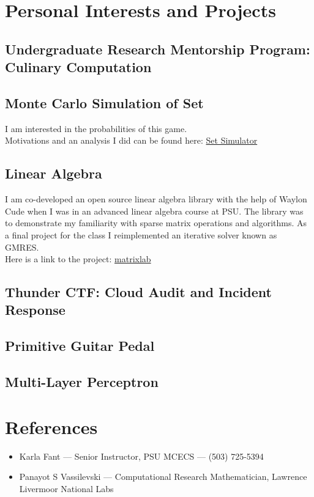 \documentclass{article}
\begin{document}
\section{Personal Interests and Projects}

\subsection{Undergraduate Research Mentorship Program: Culinary Computation}

\subsection{Monte Carlo Simulation of Set\tiny\mdseries\textregistered}
I am interested in the probabilities of this game.\\
Motivations and an analysis I did can be found here:
\href{https://www.github.com/aujxn/set_game_simulator}{Set Simulator}

\subsection{Linear Algebra}
I am co-developed an open source linear algebra library with the help
of Waylon Cude when I was in an advanced linear algebra course at PSU.
The library was to demonstrate my familiarity with sparse matrix operations and algorithms.
As a final project for the class I reimplemented an iterative solver known as GMRES.\\
Here is a link to the project: \href{https://www.gitlab.com/AustenN/matrixlab}{matrixlab}

\subsection{Thunder CTF: Cloud Audit and Incident Response}

\subsection{Primitive Guitar Pedal}

\subsection{Multi-Layer Perceptron}

\section{References}
\begin{itemize}
\item Karla Fant --- Senior Instructor, PSU MCECS --- (503) 725-5394
\item Panayot S Vassilevski --- Computational Research Mathematician, Lawrence Livermoor National Labs
\end{itemize}
\end{document}
